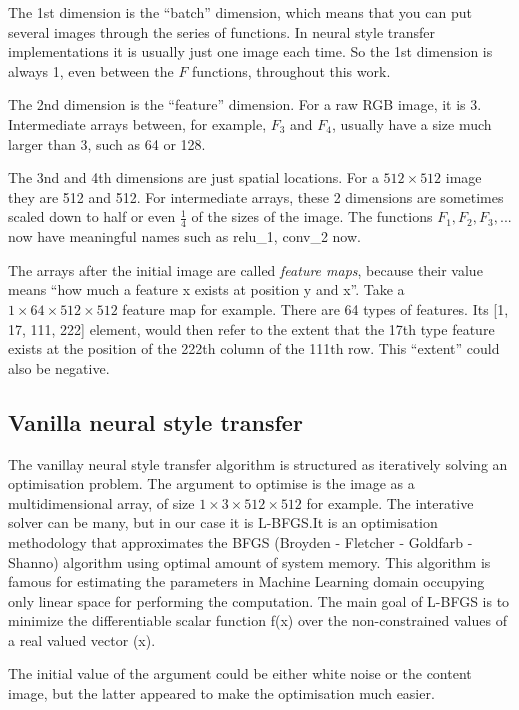 \documentclass[runningheads]{llncs}
\begin{document}
The 1st dimension is the ``batch'' dimension, which means that you can put several images through the
series of functions.
In neural style transfer implementations it is usually just one image each time.
So the 1st dimension is always 1, even between the $F$ functions, throughout this work.

The 2nd dimension is the ``feature'' dimension. For a raw RGB image, it is 3.
Intermediate arrays between, for example, $F_3$ and $F_4$, usually 
have a size much larger than 3, such as 64 or 128.

The 3nd and 4th dimensions are just spatial locations. 
For a $512\times512$ image they are 512 and 512. 
For intermediate arrays, these 2 dimensions are sometimes scaled down
to half or even $\frac{1}{4}$ of the sizes of the image. 
The functions $F_1,F_2,F_3,...$ now have meaningful names such as relu\_1, conv\_2 now.

The arrays after the initial image are called \emph{feature maps}, because their value means
``how much a feature x exists at position y and x''.
Take a $1\times64\times512\times512$ feature map for example. There are 64 types of features.
Its [1, 17, 111, 222] element, would then refer to the extent that the 17th type feature exists
at the position of the 222th column of the 111th row. This ``extent'' could also be negative.

\subsection{Vanilla neural style transfer}

The vanillay neural style transfer algorithm \cite{nst} is 
structured as iteratively solving an optimisation problem.
The argument to optimise is the image as a multidimensional array,
of size $1\times3\times512\times512$ for example.
The interative solver can be many, but in our case it is 
L-BFGS.It is an optimisation methodology that approximates the BFGS (Broyden - 
Fletcher - Goldfarb - Shanno) algorithm using optimal amount of system 
memory. This algorithm is famous for estimating the parameters in Machine 
Learning domain occupying only linear space for performing the computation. 
The main goal of L-BFGS is to minimize the differentiable scalar function f(x)
over the non-constrained values of  a real valued vector (x). 
 
The initial value of the argument could be either white noise or the content image,
but the latter appeared to make the optimisation much easier.
\end{document}
